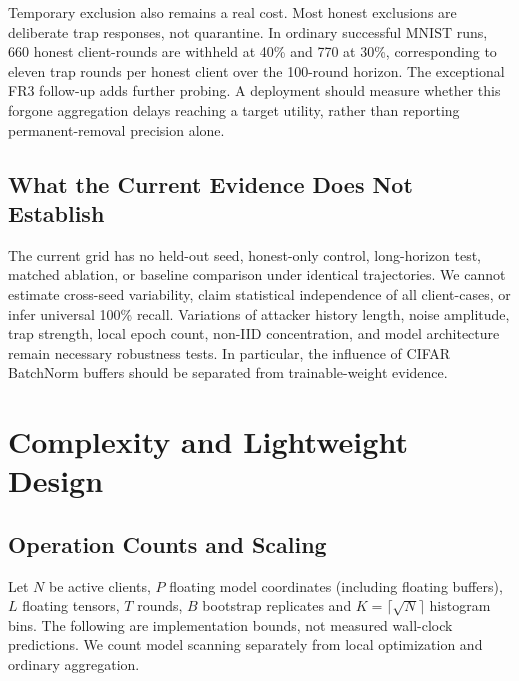 \documentclass[conference]{IEEEtran}
\begin{document}
Temporary exclusion also remains a real cost. Most honest exclusions are
deliberate trap responses, not quarantine. In ordinary successful MNIST runs,
660 honest client-rounds are withheld at 40\% and 770 at 30\%, corresponding
to eleven trap rounds per honest client over the 100-round horizon. The
exceptional FR3 follow-up adds further probing. A deployment should measure
whether this forgone aggregation delays reaching a target utility, rather
than reporting permanent-removal precision alone.

\subsection{What the Current Evidence Does Not Establish}
The current grid has no held-out seed, honest-only control, long-horizon test,
matched ablation, or baseline comparison under identical trajectories. We cannot
estimate cross-seed variability, claim statistical independence of all client-cases,
or infer universal 100\% recall. Variations of attacker history length, noise
amplitude, trap strength, local epoch count, non-IID concentration, and model
architecture remain necessary robustness tests. In particular, the influence of
CIFAR BatchNorm buffers should be separated from trainable-weight evidence.

\section{Complexity and Lightweight Design}\label{sec:complexity}
\subsection{Operation Counts and Scaling}
Let $N$ be active clients, $P$ floating model coordinates (including floating
buffers), $L$ floating tensors, $T$ rounds, $B$ bootstrap replicates and
$K=\lceil\sqrt{N}\rceil$ histogram bins. The following are implementation
bounds, not measured wall-clock predictions. We count model scanning separately
from local optimization and ordinary aggregation.
\end{document}
